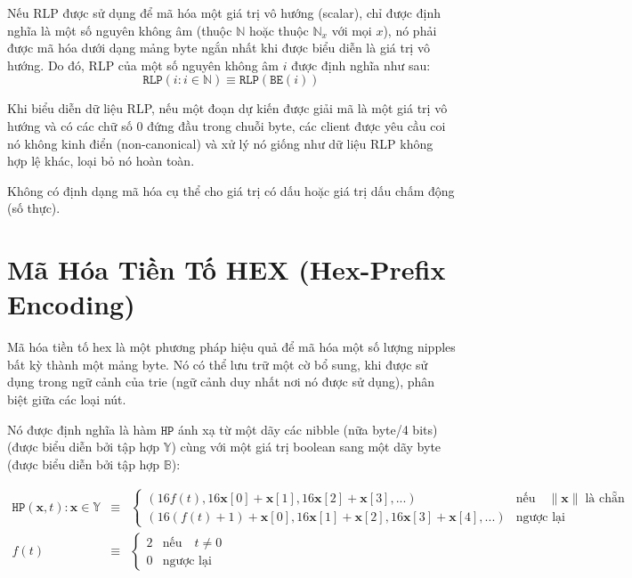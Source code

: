 \documentclass[9pt,oneside]{amsart}
\makeatletter
\newcommand{\linkdest}[1]{\Hy@raisedlink{\hypertarget{#1}{}}}
\makeatother
\begin{document}
Nếu RLP được sử dụng để mã hóa một giá trị vô hướng (scalar), chỉ được định nghĩa là một số nguyên không âm (thuộc $\mathbb{N}$ hoặc thuộc $\mathbb{N}_x$ với mọi $x$), nó phải được mã hóa dưới dạng mảng byte ngắn nhất khi được biểu diễn là giá trị vô hướng. Do đó, RLP của một số nguyên không âm $i$ được định nghĩa như sau:
\begin{equation}
\mathtt{RLP}(i : i \in \mathbb{N}) \equiv \mathtt{RLP}(\mathtt{BE}(i))
\end{equation}

Khi biểu diễn dữ liệu RLP, nếu một đoạn dự kiến được giải mã là một giá trị vô hướng và có các chữ số 0 đứng đầu trong chuỗi byte, các client được yêu cầu coi nó không kinh điển (non-canonical) và xử lý nó giống như dữ liệu RLP không hợp lệ khác, loại bỏ nó hoàn toàn.

Không có định dạng mã hóa cụ thể cho giá trị có dấu hoặc giá trị dấu chấm động (số thực).

\section{Mã Hóa Tiền Tố HEX (Hex-Prefix Encoding)}\label{app:hexprefix}
Mã hóa tiền tố hex là một phương pháp hiệu quả để mã hóa một số lượng nipples bất kỳ thành một mảng byte. Nó có thể lưu trữ một cờ bổ sung, khi được sử dụng trong ngữ cảnh của trie (ngữ cảnh duy nhất nơi nó được sử dụng), phân biệt giữa các loại nút.

Nó được định nghĩa là hàm $\mathtt{HP}$ ánh xạ từ một dãy các nibble (nữa byte/4 bits) (được biểu diễn bởi tập hợp \linkdest{set_of_sequence_of_nibbles}$\mathbb{Y}$) cùng với một giá trị boolean sang một dãy byte (được biểu diễn bởi tập hợp $\mathbb{B}$):

\begin{eqnarray}
\mathtt{HP}(\mathbf{x}, t): \mathbf{x} \in \mathbb{Y} & \equiv & \begin{cases}
(16f(t), 16\mathbf{x}[0] + \mathbf{x}[1], 16\mathbf{x}[2] + \mathbf{x}[3], ...) &
\text{nếu} \quad \lVert \mathbf{x} \rVert \; \text{là chẵn} \\
(16(f(t) + 1) + \mathbf{x}[0], 16\mathbf{x}[1] + \mathbf{x}[2], 16\mathbf{x}[3] + \mathbf{x}[4], ...) &
\text{ngược lại}
\end{cases} \\
f(t) & \equiv & \begin{cases} 2 & \text{nếu} \quad t \neq 0 \\ 0 & \text{ngược lại} \end{cases}
\end{eqnarray}
\end{document}
